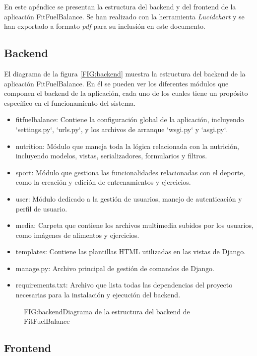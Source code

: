 En este apéndice se presentan la estructura del backend y del frontend de la aplicación FitFuelBalance. Se han realizado con la herramienta \textit{Lucidchart} y se han exportado a formato \textit{pdf} para su inclusión en este documento.

\subsection{Backend}

El diagrama de la figura \ref{FIG:backend} muestra la estructura del backend de la aplicación FitFuelBalance. En él se pueden ver los diferentes módulos que componen el backend de la aplicación, cada uno de los cuales tiene un propósito específico en el funcionamiento del sistema. 

\begin{itemize}
  \item fitfuelbalance: Contiene la configuración global de la aplicación, incluyendo `settings.py`, `urls.py`, y los archivos de arranque `wsgi.py` y `asgi.py`.
  \item nutrition: Módulo que maneja toda la lógica relacionada con la nutrición, incluyendo modelos, vistas, serializadores, formularios y filtros.
  \item sport: Módulo que gestiona las funcionalidades relacionadas con el deporte, como la creación y edición de entrenamientos y ejercicios.
  \item user: Módulo dedicado a la gestión de usuarios, manejo de autenticación y perfil de usuario.
  \item media: Carpeta que contiene los archivos multimedia subidos por los usuarios, como imágenes de alimentos y ejercicios.
  \item templates: Contiene las plantillas HTML utilizadas en las vistas de Django.
  \item manage.py: Archivo principal de gestión de comandos de Django.
  \item requirements.txt: Archivo que lista todas las dependencias del proyecto necesarias para la instalación y ejecución del backend.
\end{itemize}

\begin{figure}[Diagrama de la estructura del backend]{FIG:backend}{Diagrama de la estructura del backend de FitFuelBalance}
\end{figure}

\subsection{Frontend}


